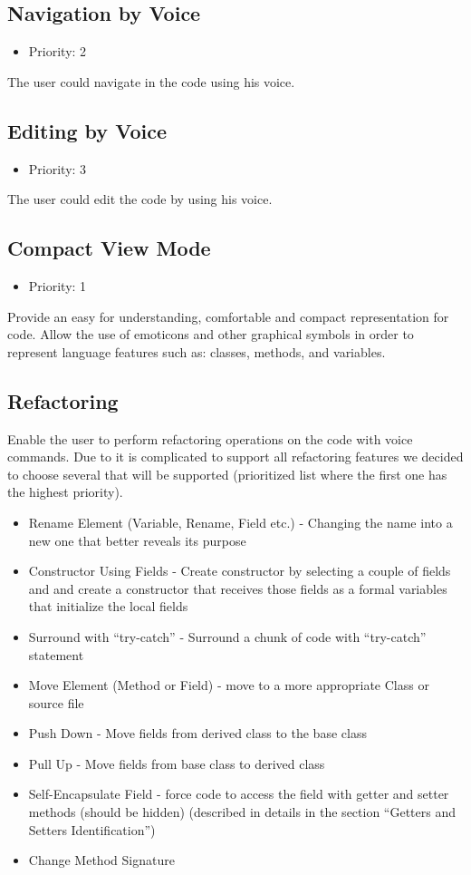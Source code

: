 \subsection{Navigation by Voice} \label{ssec:num1}
\begin{itemize}
	\item Priority: 2
\end{itemize}
The user could navigate in the code using his voice.
\subsection{Editing by Voice}
\begin{itemize}
	\item Priority: 3
\end{itemize}
The user could edit the code by using his voice.
\subsection{Compact View Mode}
\begin{itemize}
	\item Priority: 1
\end{itemize}
Provide an easy for understanding, comfortable and compact representation for code. Allow the use of emoticons and other graphical symbols in order to represent language features such as: classes, methods, and variables.
\subsection{Refactoring}
Enable the user to perform refactoring operations on the code with voice commands. Due to it is complicated to support all refactoring features we decided to choose several that will be supported (prioritized list where the first one has the highest priority).
\begin{itemize}
	\item Rename Element (Variable, Rename, Field etc.) - Changing the name into a new one that better reveals its purpose
	\item Constructor Using Fields - Create constructor by selecting a couple of fields and and create a constructor that receives those fields as a formal variables that initialize the local fields
	\item Surround with “try-catch” - Surround a chunk of code with “try-catch” statement
	\item Move Element (Method or Field) - move to a more appropriate Class or source file
	\item Push Down - Move fields from derived class to the base class
	\item Pull Up - Move fields from base class to derived class
	\item Self-Encapsulate Field - force code to access the field with getter and setter methods (should be hidden) (described in details in the section “Getters and Setters Identification”)
	\item Change Method Signature
\end{itemize}
